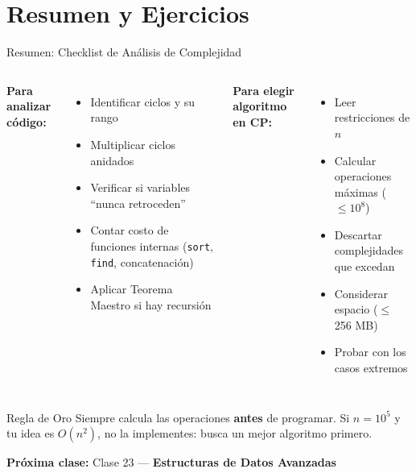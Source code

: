 \documentclass[aspectratio=169]{beamer}
\begin{document}
\section{Resumen y Ejercicios}
\begin{frame}{Resumen: Checklist de Análisis de Complejidad}
    \begin{columns}[t]
        \textbf{Para analizar código:}
        \begin{itemize}
            \item[$\square$] Identificar ciclos y su rango
            \item[$\square$] Multiplicar ciclos anidados
            \item[$\square$] Verificar si variables ``nunca retroceden''
            \item[$\square$] Contar costo de funciones internas (\texttt{sort}, \texttt{find}, concatenación)
            \item[$\square$] Aplicar Teorema Maestro si hay recursión
        \end{itemize}
        
        \textbf{Para elegir algoritmo en CP:}
        \begin{itemize}
            \item[$\square$] Leer restricciones de $n$
            \item[$\square$] Calcular operaciones máximas ($\leq 10^8$)
            \item[$\square$] Descartar complejidades que excedan
            \item[$\square$] Considerar espacio ($\leq$ 256 MB)
            \item[$\square$] Probar con los casos extremos
        \end{itemize}
    \end{columns}
    
    \vspace{0.3cm}
    \begin{block}{Regla de Oro}
        Siempre calcula las operaciones \textbf{antes} de programar. Si $n = 10^5$ y tu idea es $O(n^2)$, no la implementes: busca un mejor algoritmo primero.
    \end{block}
    
    \vspace{0.2cm}
    \textbf{Próxima clase:} Clase 23 --- \textbf{Estructuras de Datos Avanzadas}
\end{frame}
\end{document}
